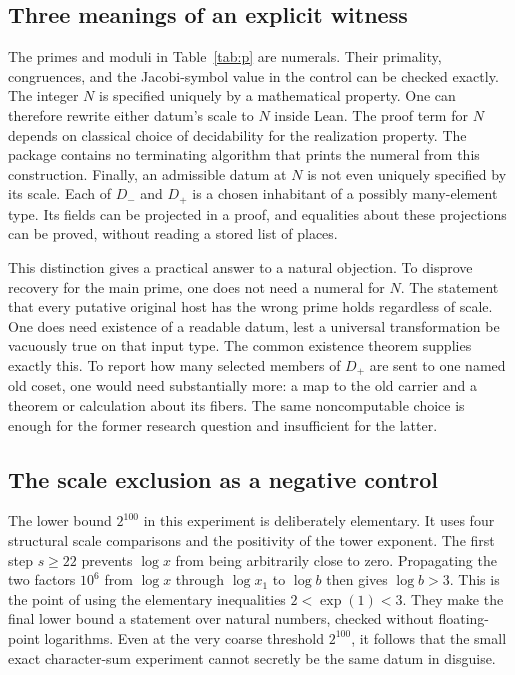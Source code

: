 \documentclass[12pt,letterpaper]{article}
\begin{document}
\subsection{Three meanings of an explicit witness}
The primes and moduli in Table~\ref{tab:p} are numerals. Their primality, congruences, and the Jacobi-symbol value in the control can be checked exactly. The integer $N$ is specified uniquely by a mathematical property. One can therefore rewrite either datum's scale to $N$ inside Lean. The proof term for $N$ depends on classical choice of decidability for the realization property. The package contains no terminating algorithm that prints the numeral from this construction. Finally, an admissible datum at $N$ is not even uniquely specified by its scale. Each of $D_-$ and $D_+$ is a chosen inhabitant of a possibly many-element type. Its fields can be projected in a proof, and equalities about these projections can be proved, without reading a stored list of places.

This distinction gives a practical answer to a natural objection. To disprove recovery for the main prime, one does not need a numeral for $N$. The statement that every putative original host has the wrong prime holds regardless of scale. One does need existence of a readable datum, lest a universal transformation be vacuously true on that input type. The common existence theorem supplies exactly this. To report how many selected members of $D_+$ are sent to one named old coset, one would need substantially more: a map to the old carrier and a theorem or calculation about its fibers. The same noncomputable choice is enough for the former research question and insufficient for the latter.

\subsection{The scale exclusion as a negative control}
The lower bound $2^{100}$ in this experiment is deliberately elementary. It uses four structural scale comparisons and the positivity of the tower exponent. The first step $s\ge22$ prevents $\log x$ from being arbitrarily close to zero. Propagating the two factors $10^6$ from $\log x$ through $\log x_1$ to $\log b$ then gives $\log b>3$. This is the point of using the elementary inequalities $2<\exp(1)<3$. They make the final lower bound a statement over natural numbers, checked without floating-point logarithms. Even at the very coarse threshold $2^{100}$, it follows that the small exact character-sum experiment cannot secretly be the same datum in disguise.
\end{document}
